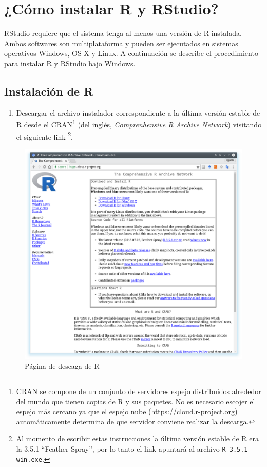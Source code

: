 \documentclass[a4paper]{book}
\providecommand{\tightlist}{%
  \setlength{\itemsep}{0pt}\setlength{\parskip}{0pt}}
\let\rmarkdownfootnote\footnote%
\def\footnote{\protect\rmarkdownfootnote}
\begin{document}
\hypertarget{como-instalar-r-y-rstudio}{%
\section{¿Cómo instalar R y RStudio?}\label{como-instalar-r-y-rstudio}}

RStudio requiere que el sistema tenga al menos una versión de R
instalada. Ambos softwares son multiplataforma y pueden ser ejecutados
en sistemas operativos Windows, OS X y Linux. A continuación se describe
el procedimiento para instalar R y RStudio bajo Windows.

\hypertarget{instalacion-de-r}{%
\subsection{Instalación de R}\label{instalacion-de-r}}

\begin{enumerate}
\def\labelenumi{\arabic{enumi})}
\tightlist
\item
  Descargar el archivo instalador correspondiente a la última versión
  estable de R desde el CRAN\footnote{CRAN se compone de un conjunto de
    servidores espejo distribuidos alrededor del mundo que tienen copias
    de R y sus paquetes. No es necesario escojer el espejo más cercano
    ya que el espejo nube (\url{https://cloud.r-project.org})
    automáticamente determina de que servidor conviene realizar la
    descarga.} (del inglés, \emph{Comprenhensive R Archive Network})
  visitando el siguiente
  \href{https://cloud.r-project.org/bin/windows/base/release.htm}{link}
  \footnote{Al momento de escribir estas instrucciones la última versión
    estable de R era la 3.5.1 ``Feather Spray'', por lo tanto el link
    apuntará al archivo \texttt{R-3.5.1-win.exe}.}.
\end{enumerate}

\begin{figure}[h]

{\centering \includegraphics[width=0.75\linewidth,]{images/choose_OS} 

}

\caption{Página de descaga de R}\label{fig:unnamed-chunk-6}
\end{figure}
\end{document}

